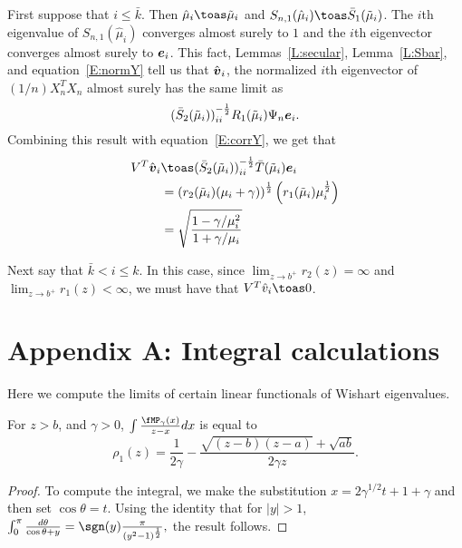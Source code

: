 First suppose that $i \leq \bar k$.  Then $\hat \mu_i \toas \tilde \mu_i$ and
$S_{n,1}(\hat \mu_i) \toas \bar S_1 (\tilde \mu_i)$.  The $i$th eigenvalue
of $S_{n,1} (\hat \mu_i)$ converges almost surely to $1$ and the $i$th
eigenvector converges almost surely to $\boldsymbol{e}_i$.  This fact, 
Lemmas~\ref{L:secular}, Lemma~\ref{L:Sbar}, and equation~\eqref{E:normY} 
tell us that $\hat {\boldsymbol{v}}_i$, the normalized $i$th eigenvector of
$(1/n) X_n^T X_n$ almost surely has the same limit as
\[
    (\bar S_2(\tilde \mu_i))_{ii}^{-\frac{1}{2}} R_1(\tilde \mu_i) \Psi_n \boldsymbol{e}_i.
\]
Combining this result with equation~\eqref{E:corrY}, we get that
\begin{align*}
    V^T \hat \bv_i
        &\toas
        (\bar S_2(\tilde \mu_i))_{ii}^{-\half} \bar T(\tilde \mu_i) \be_i \\
        &= \left( r_2( \tilde \mu_i ) (\mu_i + \gamma )\right)^\half
           \left( r_1( \tilde \mu_i ) \mu_i^\half \right) \\
        &= \sqrt{
                \frac{ 1 - \gamma/\mu_i^2}
                     { 1 + \gamma/\mu_i  }
           }
\end{align*}

Next say that $\bar k < i \leq k$.  In this case, since 
$\lim_{z \to b^+} r_2(z) = \infty$ and $\lim_{z \to b^+} r_1(z) < \infty$, we must have that  $V^T \hat v_i \toas 0$.

\section*{Appendix A: Integral calculations}

Here we compute the limits of certain linear functionals of Wishart
eigenvalues.

\begin{lemma}
    For $z > b$, and $\gamma > 0$, $\int \frac{\fMP_\gamma(x)}{z - x} dx$
    is equal to
    \[
        \rho_1(z) 
        =
        \frac{1}{2 \gamma}
        -
        \frac{ \sqrt{(z - b)(z - a)} + \sqrt{ a b } }
             { 2 \gamma z}.
    \]
\end{lemma}
\begin{proof}
    To compute the integral, we make the substitution 
    $x = 2 \gamma^{1/2} t + 1 + \gamma$ and then set $\cos \theta = t$.
    Using the identity that for $|y| > 1$,
    \(
        \int_0^\pi \frac{d\theta}{\cos \theta + y}
        = \sgn(y) \frac{\pi}{(y^2 - 1)^\half},
    \)
    the result follows.
\end{proof}

